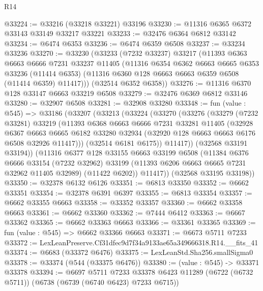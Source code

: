 \begin{lexlean}{R14}
\begin{coremodule}
@33224 := @33216 (@33218 @33221) @33196
@33230 := @11316 @6365 @6372 @33143 @33149 @33217 @33221
@33233 := @32476 @6364 @6812 @33142
@33234 := @6474 @6353
@33236 := @6474 @6359 @6508
@33237 := @33234 @33236
@33270 := @33230
    (@33233
      (@7232 @33237)
      @33217
      (@11393
        @6363
        @6663
        @6666
        @7231
        @33237
        @11405
        (@11316
          @6354
          @6362
          @6663
          @6665
          @6353
          @33236
          (@11414 @6353)
          (@11316 @6360 @128 @6663 @6663 @6359 @6508 (@11414 @6359) @11417)))
      (@32514 @6352 @6358))
@33276 := @11316 @6370 @128 @33147 @6663 @33219 @6508
@33279 := @32476 @6369 @6812 @33146
@33280 := @32907 @6508
@33281 := @32908 @33280
@33348 := fun (value : @545) =>
  @33186
    (@33207
      (@33213
        (@33224
          (@33270
            (@33276
              (@33279
                (@7232 @33281)
                @33219
                (@11393
                  @6368
                  @6663
                  @6666
                  @7231
                  @33281
                  @11405
                  (@32928
                    @6367
                    @6663
                    @6665
                    @6182
                    @33280
                    @32934
                    (@32920 @128 @6663 @6663 @6176 @6508 @32926 @11417)))
                (@32514 @6181 @6175))
              @11417))
          (@32568 @33191 @33194))
        (@11316
          @6377
          @128
          @33155
          @6663
          @33199
          @6508
          (@11384
            @6376
            @6666
            @33154
            (@7232 @32962)
            @33199
            (@11393 @6206 @6663 @6665 @7231 @32962 @11405 @32989)
            (@11422 @6202))
          @11417))
      (@32568 @33195 @33198))
@33350 := @32378 @6132 @6126
@33351 := @6813 @33350
@33352 := @6662 @33351
@33354 := @32378 @6391 @6397
@33355 := @6813 @33354
@33357 := @6662 @33355 @6663
@33358 := @33352 @33357
@33360 := @6662 @33358 @6663
@33361 := @6662 @33360
@33362 := @7444 @6412
@33363 := @6667 @33362
@33365 := @6662 @33363 @6663
@33366 := @33361 @33365
@33369 := fun (value : @545) => @6662 @33366 @6663
@33371 := @6673 @5711 @7233
@33372 := LexLeanPreserve.Cf31dfec9d7f34a9133ae65a349666318.R14.__fits_41
@33374 := @6683 (@33372 @6476)
@33375 := LexLeanStd.Sha256.smallSigma0
@33378 := @33374 (@544 (@33375 @6476))
@33380 := (value : @545) -> @33371 @33378
@33394 := @6697
    @5711
    @7233
    @33378
    @6423
    @11289
    (@6722 (@6732 @5711))
    (@6738 (@6739 (@6740 @6423) @7233 @6715))

\end{coremodule}
\end{lexlean}
